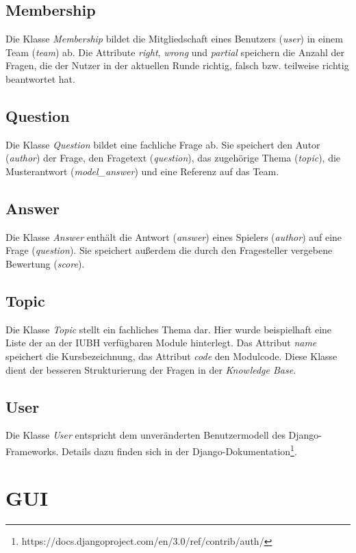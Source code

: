 \documentclass[a4paper,11pt,listof=numbered,glossary=totoc,parskip=half,toc=bib]{scrreprt}
\begin{document}
	\subsection{Membership}
	Die Klasse \textit{Membership} bildet die Mitgliedschaft eines Benutzers (\textit{user}) in einem Team (\textit{team}) ab.
	Die Attribute \textit{right}, \textit{wrong} und \textit{partial} speichern die Anzahl der Fragen, die der Nutzer in der aktuellen Runde richtig, falsch bzw. teilweise richtig beantwortet hat. 
	
	\subsection{Question}
	Die Klasse \textit{Question} bildet eine fachliche Frage ab. Sie speichert den Autor (\textit{author}) der Frage, den Fragetext (\textit{question}), das zugehörige Thema (\textit{topic}), die Musterantwort (\textit{model\_{}answer}) und eine Referenz auf das Team.
	
	\subsection{Answer}
	Die Klasse \textit{Answer} enthält die Antwort (\textit{answer}) eines Spielers (\textit{author}) auf eine Frage (\textit{question}). Sie speichert außerdem die durch den Fragesteller vergebene Bewertung (\textit{score}).
	
	\subsection{Topic}
	Die Klasse \textit{Topic} stellt ein fachliches Thema dar. Hier wurde beispielhaft eine Liste der an der IUBH verfügbaren Module hinterlegt. Das Attribut \textit{name} speichert die Kursbezeichnung, das Attribut \textit{code} den Modulcode. Diese Klasse dient der besseren Strukturierung der Fragen in der \textit{Knowledge Base}.

	\subsection{User}
	Die Klasse \textit{User} entspricht dem unveränderten Benutzermodell des Django-Frameworks. Details dazu finden sich in der Django-Dokumentation\footnote{https://docs.djangoproject.com/en/3.0/ref/contrib/auth/}.	
	
	\section{GUI}
	
\end{document}
